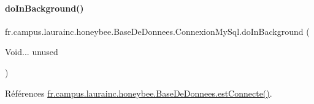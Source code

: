 \paragraph{\texorpdfstring{do\+In\+Background()}{doInBackground()}}
{\footnotesize\ttfamily fr.\+campus.\+laurainc.\+honeybee.\+Base\+De\+Donnees.\+Connexion\+My\+Sql.\+do\+In\+Background (\begin{DoxyParamCaption}\item[{Void...}]{unused }\end{DoxyParamCaption})\hspace{0.3cm}{\ttfamily [protected]}}



Références \hyperlink{classfr_1_1campus_1_1laurainc_1_1honeybee_1_1_base_de_donnees_a735f54c2c183a595c9a9a5ba947491f5}{fr.\+campus.\+laurainc.\+honeybee.\+Base\+De\+Donnees.\+est\+Connecte()}.


